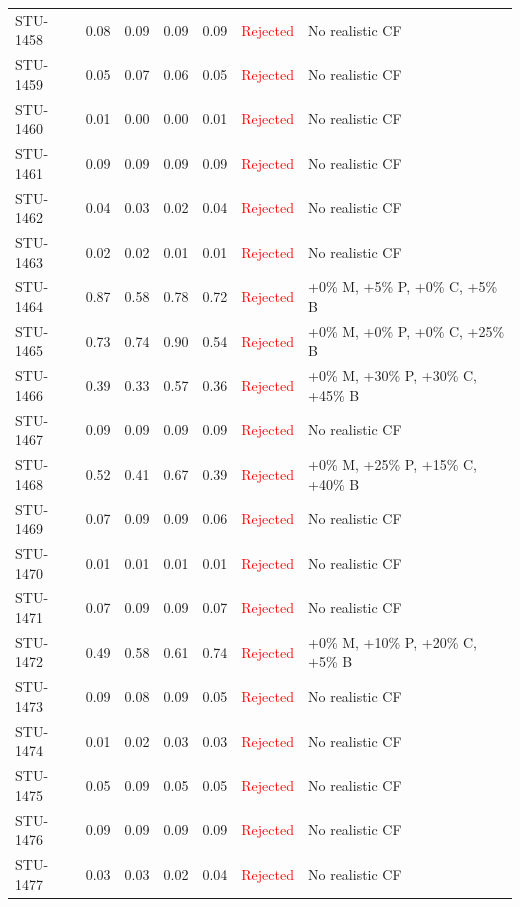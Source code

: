 \begin{longtable}{l c c c c | c | l}
STU-1458 & 0.08 & 0.09 & 0.09 & 0.09 & \textcolor{red}{Rejected} & No realistic CF \\
STU-1459 & 0.05 & 0.07 & 0.06 & 0.05 & \textcolor{red}{Rejected} & No realistic CF \\
STU-1460 & 0.01 & 0.00 & 0.00 & 0.01 & \textcolor{red}{Rejected} & No realistic CF \\
STU-1461 & 0.09 & 0.09 & 0.09 & 0.09 & \textcolor{red}{Rejected} & No realistic CF \\
STU-1462 & 0.04 & 0.03 & 0.02 & 0.04 & \textcolor{red}{Rejected} & No realistic CF \\
STU-1463 & 0.02 & 0.02 & 0.01 & 0.01 & \textcolor{red}{Rejected} & No realistic CF \\
STU-1464 & 0.87 & 0.58 & 0.78 & 0.72 & \textcolor{red}{Rejected} & +0\% M, +5\% P, +0\% C, +5\% B \\
STU-1465 & 0.73 & 0.74 & 0.90 & 0.54 & \textcolor{red}{Rejected} & +0\% M, +0\% P, +0\% C, +25\% B \\
STU-1466 & 0.39 & 0.33 & 0.57 & 0.36 & \textcolor{red}{Rejected} & +0\% M, +30\% P, +30\% C, +45\% B \\
STU-1467 & 0.09 & 0.09 & 0.09 & 0.09 & \textcolor{red}{Rejected} & No realistic CF \\
STU-1468 & 0.52 & 0.41 & 0.67 & 0.39 & \textcolor{red}{Rejected} & +0\% M, +25\% P, +15\% C, +40\% B \\
STU-1469 & 0.07 & 0.09 & 0.09 & 0.06 & \textcolor{red}{Rejected} & No realistic CF \\
STU-1470 & 0.01 & 0.01 & 0.01 & 0.01 & \textcolor{red}{Rejected} & No realistic CF \\
STU-1471 & 0.07 & 0.09 & 0.09 & 0.07 & \textcolor{red}{Rejected} & No realistic CF \\
STU-1472 & 0.49 & 0.58 & 0.61 & 0.74 & \textcolor{red}{Rejected} & +0\% M, +10\% P, +20\% C, +5\% B \\
STU-1473 & 0.09 & 0.08 & 0.09 & 0.05 & \textcolor{red}{Rejected} & No realistic CF \\
STU-1474 & 0.01 & 0.02 & 0.03 & 0.03 & \textcolor{red}{Rejected} & No realistic CF \\
STU-1475 & 0.05 & 0.09 & 0.05 & 0.05 & \textcolor{red}{Rejected} & No realistic CF \\
STU-1476 & 0.09 & 0.09 & 0.09 & 0.09 & \textcolor{red}{Rejected} & No realistic CF \\
STU-1477 & 0.03 & 0.03 & 0.02 & 0.04 & \textcolor{red}{Rejected} & No realistic CF \\

\end{longtable}
